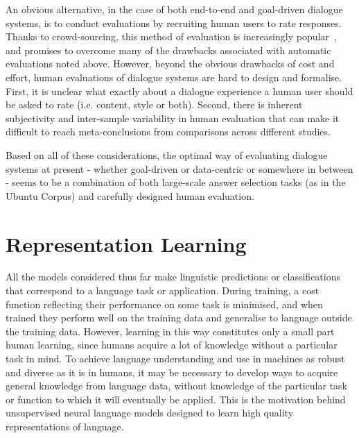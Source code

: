 \documentclass[11pt,letterpaper]{article}
\begin{document}
An obvious alternative, in the case of both end-to-end and goal-driven dialogue systems, is to conduct evaluations by recruiting human users to rate responses. Thanks to crowd-sourcing, this method of evaluation is increasingly popular~\cite{serban2016hierarchical,wen2016network}, and promises to overcome many of the drawbacks associated with automatic evaluations noted above. However, beyond the obvious drawbacks of cost and effort, human evaluations of dialogue systems are hard to design and formalise. First, it is unclear what exactly about a dialogue experience a human user should be asked to rate (i.e. content, style or both). Second, there is inherent subjectivity and inter-sample variability in human evaluation that can make it difficult to reach meta-conclusions from comparisons across different studies. 

Based on all of these considerations, the optimal way of evaluating dialogue systems at present - whether goal-driven or data-centric or somewhere in between - seems to be a  combination of both large-scale answer selection tasks (as in the Ubuntu Corpus) and carefully designed human evaluation.  


\section{Representation Learning}
All the models considered thus far make linguistic predictions or classifications that correspond to a language task or application. During training, a cost function reflecting their performance on some task is minimised, and when trained they perform well on the training data and generalise to language outside the training data. However, learning in this way constitutes only a small part human learning, since humans acquire a lot of knowledge without a particular task in mind. To achieve language understanding and use in machines as robust and diverse as it is in humans, it may be necessary to develop ways to acquire general knowledge from language data, without knowledge of the particular task or function to which it will eventually be applied. This is the motivation behind unsupervised neural language models designed to learn high quality representations of language. 
\end{document}
